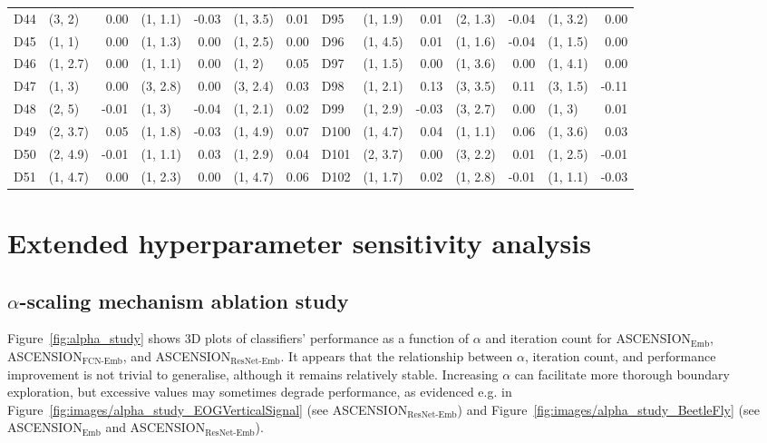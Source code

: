 \begin{table}[p]
\begin{tabular}{l|lr|lr|lr||l|lr|lr|lr}
D44 & (3, 2) & 0.00 & (1, 1.1) & -0.03 & (1, 3.5) & 0.01 & D95 & (1, 1.9) & 0.01 & (2, 1.3) & -0.04 & (1, 3.2) & 0.00 \\
D45 & (1, 1) & 0.00 & (1, 1.3) & 0.00 & (1, 2.5) & 0.00 & D96 & (1, 4.5) & 0.01 & (1, 1.6) & -0.04 & (1, 1.5) & 0.00 \\
D46 & (1, 2.7) & 0.00 & (1, 1.1) & 0.00 & (1, 2) & 0.05 & D97 & (1, 1.5) & 0.00 & (1, 3.6) & 0.00 & (1, 4.1) & 0.00 \\
D47 & (1, 3) & 0.00 & (3, 2.8) & 0.00 & (3, 2.4) & 0.03 & D98 & (1, 2.1) & 0.13 & (3, 3.5) & 0.11 & (3, 1.5) & -0.11 \\
D48 & (2, 5) & -0.01 & (1, 3) & -0.04 & (1, 2.1) & 0.02 & D99 & (1, 2.9) & -0.03 & (3, 2.7) & 0.00 & (1, 3) & 0.01 \\
D49 & (2, 3.7) & 0.05 & (1, 1.8) & -0.03 & (1, 4.9) & 0.07 & D100 & (1, 4.7) & 0.04 & (1, 1.1) & 0.06 & (1, 3.6) & 0.03 \\
D50 & (2, 4.9) & -0.01 & (1, 1.1) & 0.03 & (1, 2.9) & 0.04 & D101 & (2, 3.7) & 0.00 & (3, 2.2) & 0.01 & (1, 2.5) & -0.01 \\
D51 & (1, 4.7) & 0.00 & (1, 2.3) & 0.00 & (1, 4.7) & 0.06 & D102 & (1, 1.7) & 0.02 & (1, 2.8) & -0.01 & (1, 1.1) & -0.03 \\
\bottomrule
\end{tabular}
\end{table}


\section{Extended hyperparameter sensitivity analysis} \label{app:HPSA}

\subsection{$\alpha$-scaling mechanism ablation study} \label{app:HPSA:alpha}
Figure~\ref{fig:alpha_study} shows 3D plots of classifiers' performance as a function of $\alpha$ and iteration count for ASCENSION$_{\text{Emb}}$, ASCENSION$_\text{FCN-Emb}$, and ASCENSION$_\text{ResNet-Emb}$. It appears that the relationship between $\alpha$, iteration count, and performance improvement is not trivial to generalise, although it remains relatively stable. Increasing $\alpha$ can facilitate more thorough boundary exploration, but excessive values may sometimes degrade performance, as evidenced e.g. in Figure~\ref{fig:images/alpha_study_EOGVerticalSignal} (see ASCENSION$_{\text{ResNet-Emb}}$) and Figure~\ref{fig:images/alpha_study_BeetleFly} (see ASCENSION$_{\text{Emb}}$ and ASCENSION$_{\text{ResNet-Emb}}$). 

